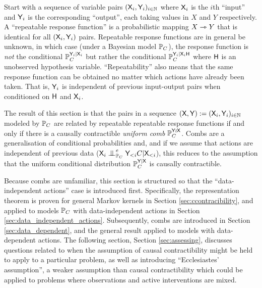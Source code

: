 Start with a sequence of variable pairs $(\mathsf{X}_i,\mathsf{Y}_i)_{i\in \mathbb{N}}$ where $\mathsf{X}_i$ is the $i$th ``input'' and $\mathsf{Y}_i$ is the corresponding ``output'', each taking values in $X$ and $Y$ respectively. A ``repeatable response function'' is a probabilistic mapping $X\rightarrowtriangle Y$ that is identical for all $(\mathsf{X}_i,\mathsf{Y}_i)$ pairs. Repeatable response functions are in general be unknown, in which case (under a Bayesian model $\mathbb{P}_C$), the response function is \emph{not} the conditional $\mathbb{P}_C^{\mathsf{Y}_i|\mathsf{X}_i}$ but rather the conditional $\mathbb{P}_C^{\mathsf{Y}_i|\mathsf{X}_i\mathsf{H}}$ where $\mathsf{H}$ is an unobserved hypothesis variable. ``Repeatability'' also means that the same response function can be obtained no matter which actions have already been taken. That is, $\mathsf{Y}_i$ is independent of previous input-output pairs when conditioned on $\mathsf{H}$ and $\mathsf{X}_i$.

The result of this section is that the pairs in a sequence $(\mathsf{X},\mathsf{Y}):=(\mathsf{X}_i,\mathsf{Y}_i)_{i\in \mathbb{N}}$ modeled by $\mathbb{P}_C$ are related by repeatable repeatable response functions if and only if there is a causally contractible \emph{uniform comb} $\mathbb{P}_C^{\mathsf{Y}\wr\mathsf{X}}$. Combs are a generalisation of conditional probabilities and, and if we assume that actions are independent of previous data ($\RV{X}_i\CI_{\prob{P}_C}^e \RV{Y}_{<i} C|\RV{X}_{<i}$), this reduces to the assumption that the uniform conditional distribution $\mathbb{P}_C^{\mathsf{Y}|\mathsf{X}}$ is causally contractible.

Because combs are unfamiliar, this section is structured so that the ``data-independent actions'' case is introduced first. Specifically, the representation theorem is proven for general Markov kernels in Section \ref{sec:ccontracibility}, and applied to models $\mathbb{P}_C$ with data-independent actions in Section \ref{sec:data_independent_actions}. Subsequently, combs are introduced in Section \ref{sec:data_dependent}, and the general result applied to models with data-dependent actions. The following section, Section \ref{sec:assessing}, discusses questions related to when the assumption of causal contractibility might be held to apply to a particular problem, as well as introducing ``Ecclesiastes' assumption'', a weaker assumption than causal contractibility which could be applied to problems where observations and active interventions are mixed.


